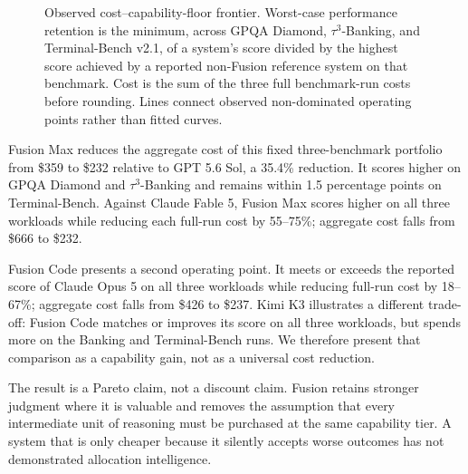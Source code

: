 \begin{figure}[H]
\caption{Observed cost--capability-floor frontier. Worst-case performance
retention is the minimum, across GPQA Diamond, $\tau^3$-Banking, and
Terminal-Bench v2.1, of a system's score divided by the highest score achieved
by a reported non-Fusion reference system on that benchmark. Cost is the sum
of the three full benchmark-run costs before rounding. Lines connect observed
non-dominated operating points rather than fitted curves.}
\label{fig:observed-pareto}
\end{figure}

Fusion Max reduces the aggregate cost of this fixed three-benchmark portfolio
from \$359 to \$232 relative to GPT 5.6 Sol, a 35.4\% reduction. It scores
higher on GPQA Diamond and $\tau^3$-Banking and remains within 1.5 percentage
points on Terminal-Bench. Against Claude Fable 5, Fusion Max scores higher on
all three workloads while reducing each full-run cost by 55--75\%; aggregate
cost falls from \$666 to \$232.

Fusion Code presents a second operating point. It meets or exceeds the reported
score of Claude Opus 5 on all three workloads while reducing full-run cost by
18--67\%; aggregate cost falls from \$426 to \$237. Kimi K3 illustrates a
different trade-off: Fusion Code matches or improves its score on all three
workloads, but spends more on the Banking and Terminal-Bench runs. We therefore
present that comparison as a capability gain, not as a universal cost
reduction.

The result is a Pareto claim, not a discount claim. Fusion retains stronger
judgment where it is valuable and removes the assumption that every
intermediate unit of reasoning must be purchased at the same capability tier.
A system that is only cheaper because it silently accepts worse outcomes has
not demonstrated allocation intelligence.

